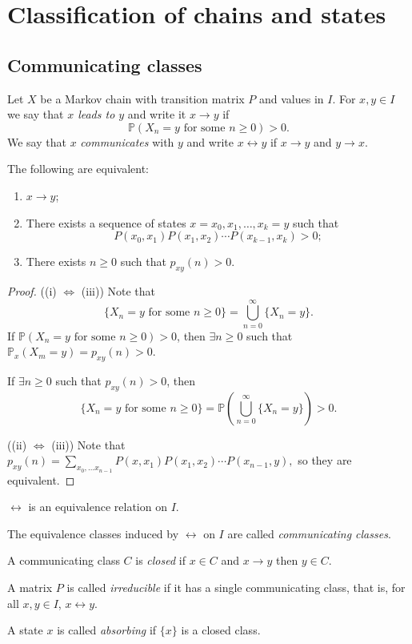 \documentclass[a4paper]{article}
\begin{document}
\section{Classification of chains and states}
\subsection{Communicating classes}
\begin{definition}
    Let $X$ be a Markov chain with transition matrix $P$ and values in $I$. For $x, y \in I$ we say that \emph{$x$ leads to $y$} and write it $x \rightarrow y$ if
    $$
    \mathbb{P}(X_n = y \text{ for some }n \ge 0) > 0. 
    $$
    We say that $x$ \emph{communicates} with $y$ and write $x \leftrightarrow y$ if $x \rightarrow y$ and $y \rightarrow x$.  
\end{definition}

\begin{theorem}
	The following are equivalent: 
	\begin{enumerate}[label=(\roman*)]
		\item $x \rightarrow y$;
		\item There exists a sequence of states $x = x_0, x_1, \dots, x_k = y$ such that 
		$$P(x_0, x_1)P(x_1, x_2) \cdots P(x_{k - 1}, x_k) > 0;$$
		\item There exists $n \ge 0$ such that $p_{xy}(n) > 0$.
	\end{enumerate}
\end{theorem}
\begin{proof}
    ((i) $ \Leftrightarrow $ (iii)) Note that 
    \[
        \{X_n=y \text{ for some }n\ge 0\} = \bigcup_{n=0}^{\infty}\{X_n=y\}.
    \]
    If $ \mathbb{P}(X_n = y \text{ for some }n \ge 0) > 0 $, then $ \exists n\ge 0 $ such that $ \mathbb{P}_x(X_m=y)=p_{xy}(n)>0 $.

    If $ \exists n\ge 0 $ such that $ p_{xy}(n)>0 $, then 
    \[
        \{X_n=y \text{ for some }n\ge 0\}=\mathbb{P}\left( \bigcup_{n=0}^{\infty}\{X_n=y\} \right)>0.
    \]

    ((ii) $ \Leftrightarrow  $ (iii)) Note that $ p_{xy}(n) = \sum_{x_0,\dots x_{n-1}} P(x,x_1)P(x_1,x_2)\cdots P(x_{n-1},y), $
    so they are equivalent.
\end{proof}
\begin{corollary}
    $ \leftrightarrow $ is an equivalence relation on $I$.
\end{corollary}
\begin{definition}
	The equivalence classes induced by $\leftrightarrow$ on $I$ are called \emph{communicating classes}.

    A communicating class $C$ is \emph{closed} if $x \in C$ and $x \rightarrow y$ then $y \in C$.

    A matrix $P$ is called \emph{irreducible} if it has a single communicating class, that is, for all $x, y \in I$, $x \leftrightarrow y$. 

    A state $x$ is called \emph{absorbing} if $\{x\}$ is a closed class. 
\end{definition}
\end{document}
